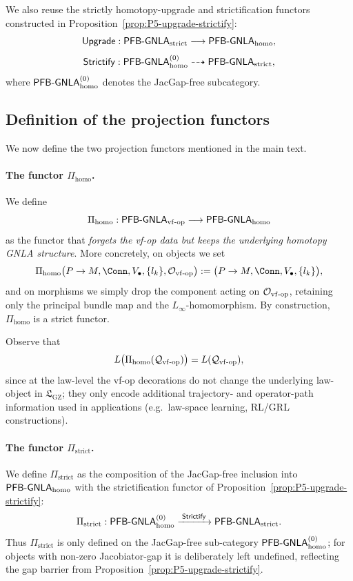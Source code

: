 \documentclass[11pt]{book}
\theoremstyle{plain}
\theoremstyle{definition}
\newcommand{\GZLS}{\ensuremath{\mathfrak{L}_{\mathrm{GZ}}}}       \newcommand{\GZLT}{\ensuremath{M_{!w}}}                           \newcommand{\GZLOC}{\ensuremath{A_M}}                             \newcommand{\GZLCurv}{\ensuremath{\mathcal{F}_{\mathrm{law}}}}
\begin{document}
We also reuse the strictly homotopy-upgrade and strictification functors
constructed in Proposition~\ref{prop:P5-upgrade-strictify}:
\[
  \mathsf{Upgrade} :
  \mathsf{PFB\text- GNLA}_{\mathrm{strict}}
  \longrightarrow
  \mathsf{PFB\text- GNLA}_{\mathrm{homo}},
\]
\[
  \mathsf{Strictify} :
  \mathsf{PFB\text- GNLA}_{\mathrm{homo}}^{(0)}
  \dashrightarrow
  \mathsf{PFB\text- GNLA}_{\mathrm{strict}},
\]
where \(\mathsf{PFB\text- GNLA}_{\mathrm{homo}}^{(0)}\) denotes the
JacGap-free subcategory.



\subsection*{Definition of the projection functors}


We now define the two projection functors mentioned in the main text.

\paragraph{The functor \(\Pi_{\mathrm{homo}}\).}
We define
\[
  \Pi_{\mathrm{homo}} :
  \mathsf{PFB\text- GNLA}_{\mathrm{vf\text- op}}
  \longrightarrow
  \mathsf{PFB\text- GNLA}_{\mathrm{homo}}
\]
as the functor that \emph{forgets the vf-op data but keeps the
underlying homotopy GNLA structure}.  More concretely, on objects we
set
\[
  \Pi_{\mathrm{homo}}\bigl(
    P\to M,\Conn,V_\bullet,\{l_k\},\mathcal{O}_{\mathrm{vf\text- op}}
  \bigr)
  :=
  \bigl(P\to M,\Conn,V_\bullet,\{l_k\}\bigr),
\]
and on morphisms we simply drop the component acting on
\(\mathcal{O}_{\mathrm{vf\text- op}}\), retaining only the principal
bundle map and the \(L_\infty\)-homomorphism.  By construction,
\(\Pi_{\mathrm{homo}}\) is a strict functor.

Observe that
\[
  L\bigl(\Pi_{\mathrm{homo}}(\mathcal{Q}_{\mathrm{vf\text- op}})\bigr)
  =
  L(\mathcal{Q}_{\mathrm{vf\text- op}}),
\]
since at the law-level the vf-op decorations do not change the
underlying law-object in \(\GZLS\); they only encode additional
trajectory- and operator-path information used in applications
(e.g.\ law-space learning, RL/GRL constructions).

\paragraph{The functor \(\Pi_{\mathrm{strict}}\).}
We define \(\Pi_{\mathrm{strict}}\) as the composition of the
JacGap-free inclusion into \(\mathsf{PFB\text- GNLA}_{\mathrm{homo}}\)
with the strictification functor of Proposition~\ref{prop:P5-upgrade-strictify}:
\[
  \Pi_{\mathrm{strict}} :
  \mathsf{PFB\text- GNLA}_{\mathrm{homo}}^{(0)}
  \xrightarrow{\;\mathsf{Strictify}\;}
  \mathsf{PFB\text- GNLA}_{\mathrm{strict}}.
\]
Thus \(\Pi_{\mathrm{strict}}\) is only defined on the JacGap-free
sub-category \(\mathsf{PFB\text- GNLA}_{\mathrm{homo}}^{(0)}\); for
objects with non-zero Jacobiator-gap it is deliberately left undefined,
reflecting the gap barrier from Proposition~\ref{prop:P5-upgrade-strictify}.
\end{document}
